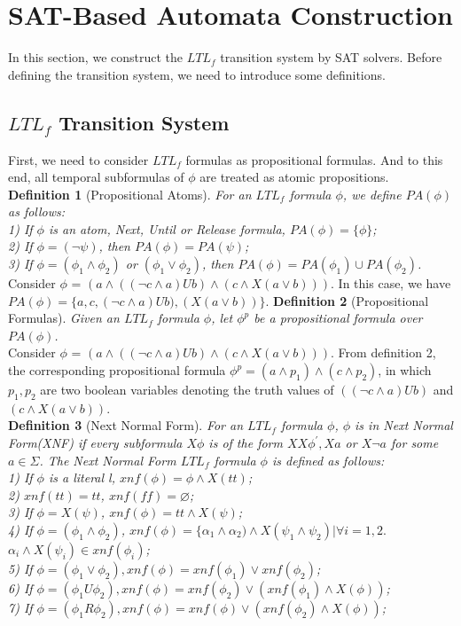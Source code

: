 \section{SAT-Based Automata Construction}
In this section, we construct the $LTL_f$ transition system by SAT solvers. Before defining the transition system, we need to introduce some definitions.\\
\subsection{$LTL_f$ Transition System}
First, we need to consider $LTL_f$ formulas as propositional formulas. And to this end, all temporal subformulas of $\phi$ are treated as atomic propositions. \\
{\bf Definition 1} (Propositional Atoms). {\it For an $LTL_f$ formula $\phi$, we define $PA(\phi)$ as follows:\\
1) If $\phi$ is an atom, Next, Until or Release formula, $PA(\phi)=\{\phi\}$;\\
2) If $\phi = (\neg \psi)$, then $PA(\phi)= PA(\psi)$;\\
3) If $\phi = (\phi_1 \wedge \phi_2)$ or $(\phi_1 \vee \phi_2)$, then $PA(\phi) = PA(\phi_1) \cup PA(\phi_2)$.
}     \\
Consider $\phi$ = $(a \wedge ((\neg c \wedge a)U b) \wedge (c \wedge X (a \vee b)))$. In this case, we have $PA(\phi)=\{a, c, (\neg c \wedge a)U b), (X (a \vee b))\}$. 
{\bf Definition 2} (Propositional Formulas). {\it Given an $LTL_f$ formula $\phi$, let $\phi^{p}$ be a propositional formula over $PA(\phi)$. \\}
Consider  $\phi$ = $(a \wedge ((\neg c \wedge a)U b) \wedge (c \wedge X (a \vee b)))$. From definition 2, the corresponding propositional formula $\phi^p = (a \wedge p_1) \wedge (c \wedge p_2)$, in which $p_1, p_2$ are two boolean variables denoting the truth values of $((\neg c \wedge a)U b)$ and $(c \wedge X (a \vee b))$. \\
{\bf Definition 3} (Next Normal Form). {\it For an $LTL_f$ formula $\phi$, $\phi$ is in Next Normal Form(XNF) if every subformula $X \phi$ is of the form $X X \phi^{\prime}, X a$ or $X \neg a$ for some $a \in \Sigma$. The Next Normal Form $LTL_f$ formula $\phi$ is defined as follows:\\ 
1) If $\phi$ is a literal l, $xnf(\phi) = \phi \wedge X(tt)$;\\
2)  $xnf(tt) =  tt$, $xnf(ff) =  \varnothing$;\\
3) If $\phi = X(\psi)$, $xnf(\phi) = tt \wedge X(\psi) $;\\
4) If $\phi = (\phi_1 \wedge \phi_2)$, $xnf(\phi) = \{\alpha_1 \wedge \alpha_2)\wedge X(\psi_1 \wedge \psi_2)| \forall i = 1,2.$ $\alpha_i \wedge X(\psi_i)\in xnf(\phi_i)$; \\
5) If $\phi = (\phi_1 \vee \phi_2), xnf(\phi) = xnf(\phi_1)\vee xnf(\phi_2)$; \\
6) If $\phi = (\phi_1 U \phi_2), xnf(\phi) = xnf(\phi_2) \vee (xnf(\phi_1) \wedge X(\phi))$; \\
7) If $\phi = (\phi_1 R \phi_2), xnf(\phi) = xnf(\phi)\vee (xnf(\phi_2) \wedge X(\phi))$; \\
}    
